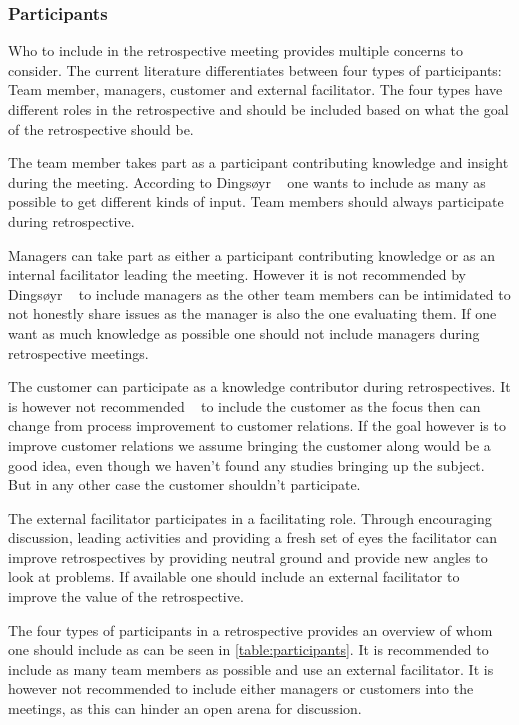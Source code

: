 \documentclass[12pt]{article}
\begin{document}
\subsubsection{Participants}
Who to include in the retrospective meeting provides multiple concerns to consider. The current literature differentiates between four types of participants: Team member, managers, customer and external facilitator. The four types have different roles in the retrospective and should be included based on what the goal of the retrospective should be. 

The team member takes part as a participant contributing knowledge and insight during the meeting. According to Dingsøyr ~\cite{Dingsoyr2005} one wants to include as many as possible to get different kinds of input. Team members should always participate during retrospective.

Managers can take part as either a participant contributing knowledge or as an internal facilitator leading the meeting. However it is not recommended by Dingsøyr ~\cite{Dingsoyr2005} to include managers as the other team members can be intimidated to not honestly share issues as the manager is also the one evaluating them. If one want as much knowledge as possible one should not include managers during retrospective meetings.

The customer can participate as a knowledge contributor during retrospectives. It is however not recommended ~\cite{Dingsoyr2005} to include the customer as the focus then can change from process improvement to customer relations. If the goal however is to improve customer relations we assume bringing the customer along would be a good idea, even though we haven't found any studies bringing up the subject. But in any other case the customer shouldn't participate.

The external facilitator participates in a facilitating role. Through encouraging discussion, leading activities and providing a fresh set of eyes the facilitator can improve retrospectives by providing neutral ground and provide new angles to look at problems. If available one should include an external facilitator to improve the value of the retrospective.

The four types of participants in a retrospective provides an overview of whom one should include as can be seen in \autoref{table:participants}. It is recommended to include as many team members as possible and use an external facilitator. It is however not recommended to include either managers or customers into the meetings, as this can hinder an open arena for discussion. 
\end{document}
